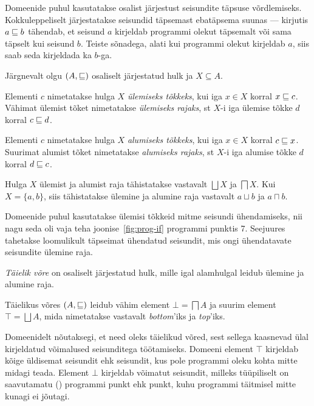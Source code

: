 \documentclass[../thesis.tex]{subfiles}
\begin{document}
Domeenide puhul kasutatakse osalist järjestust seisundite täpsuse võrdlemiseks. Kokkuleppeliselt järjestatakse seisundid täpsemast ebatäpsema suunas --- kirjutis $a \sqsubseteq b$ tähendab, et seisund $a$ kirjeldab programmi olekut täpsemalt või sama täpselt kui seisund $b$. Teiste sõnadega, alati kui programmi olekut kirjeldab $a$, siis saab seda kirjeldada ka $b$-ga.

\noindent
Järgnevalt olgu $(A, \sqsubseteq)$ osaliselt järjestatud hulk ja $X \subseteq A$.

\begin{definition}
\label{def:join}
Elementi $c$ nimetatakse hulga $X$ \emph{ülemiseks tõkkeks}, kui iga $x \in X$ korral $x \sqsubseteq c$. Vähimat ülemist tõket nimetatakse \emph{ülemiseks rajaks}, st $X$-i iga ülemise tõkke $d$ korral $c \sqsubseteq d$.
\end{definition}

\begin{definition}
\label{def:meet}
Elementi $c$ nimetatakse hulga $X$ \emph{alumiseks tõkkeks}, kui iga $x \in X$ korral $c \sqsubseteq x$. Suurimat alumist tõket nimetatakse \emph{alumiseks rajaks}, st $X$-i iga alumise tõkke $d$ korral $d \sqsubseteq c$.
\end{definition}

Hulga $X$ ülemist ja alumist raja tähistatakse vastavalt $\bigsqcup X$ ja $\bigsqcap X$. Kui $X = \{a, b\}$, siis tähistatakse ülemine ja alumine raja vastavalt $a \sqcup b$ ja $a \sqcap b$.

Domeenide puhul kasutatakse ülemisi tõkkeid mitme seisundi ühendamiseks, nii nagu seda oli vaja teha joonise~\ref{fig:prog-if} programmi punktis 7. Seejuures tahetakse loomulikult täpseimat ühendatud seisundit, mis ongi ühendatavate seisundite ülemine raja.

\begin{definition}
\emph{Täielik võre} on osaliselt järjestatud hulk, mille igal alamhulgal leidub ülemine ja alumine raja.
\end{definition}

Täielikus võres $(A, \sqsubseteq)$ leidub vähim element $\bot = \bigsqcap A$ ja suurim element $\top = \bigsqcup A$, mida nimetatakse vastavalt \textit{bottom}'iks ja \textit{top}'iks.

Domeenidelt nõutaksegi, et need oleks täielikud võred, sest sellega kaasnevad ülal kirjeldatud võimalused seisunditega töötamiseks. Domeeni element $\top$ kirjeldab kõige üldisemat seisundit ehk seisundit, kus pole programmi oleku kohta mitte midagi teada. Element $\bot$ kirjeldab võimatut seisundit, milleks tüüpiliselt on saavutamatu () programmi punkt ehk punkt, kuhu programmi täitmisel mitte kunagi ei jõutagi.
\end{document}
